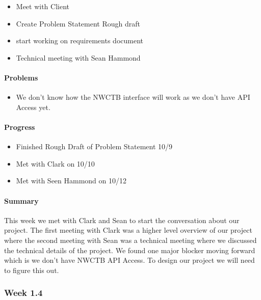 \documentclass[onecolumn, draftclsnofoot,10pt, compsoc]{article}
\begin{document}
		        \begin{itemize}
		            \item Meet with Client
		            \item Create Problem Statement Rough draft
		            \item start working on requirements document
		            \item Technical meeting with Sean Hammond
		        \end{itemize}

		    \paragraph{Problems} \hfill \break

		    \begin{itemize}
		        \item We don't know how the NWCTB interface will work as we don't have API Access yet.
		    \end{itemize}

		    \paragraph{Progress} \hfill \break

		    \begin{itemize}
		        \item Finished Rough Draft of Problem Statement 10/9
		        \item Met with Clark on 10/10
		        \item Met with Seen Hammond on 10/12
		    \end{itemize}

		    \paragraph{Summary} \hfill \break
		    	This week we met with Clark and Sean to start the conversation about our project. The first meeting with Clark was a higher level overview of our project where the second meeting with Sean was a technical meeting where we discussed the technical details of the project. We found one major blocker moving forward which is we don't have NWCTB API Access. To design our project we will need to figure this out.\\

		\subsubsection{Week 1.4}
\end{document}
